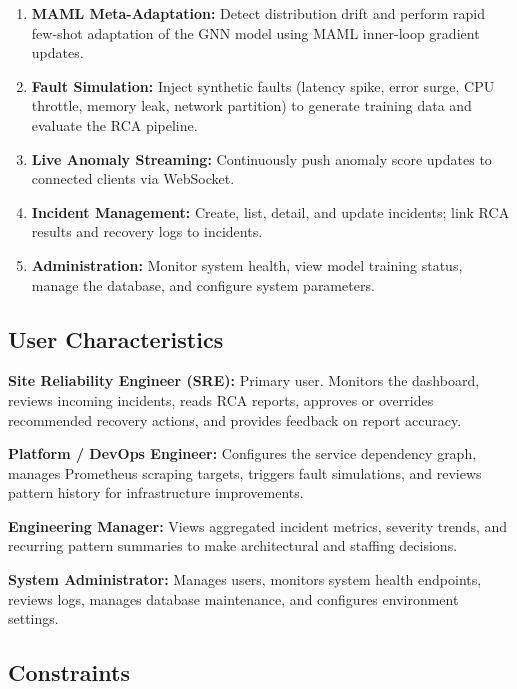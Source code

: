 \documentclass[11pt,a4paper]{article}
\begin{document}
\begin{enumerate}
    \item \textbf{MAML Meta-Adaptation:} Detect distribution drift and perform rapid few-shot adaptation of the GNN model using MAML inner-loop gradient updates.
    \item \textbf{Fault Simulation:} Inject synthetic faults (latency spike, error surge, CPU throttle, memory leak, network partition) to generate training data and evaluate the RCA pipeline.
    \item \textbf{Live Anomaly Streaming:} Continuously push anomaly score updates to connected clients via WebSocket.
    \item \textbf{Incident Management:} Create, list, detail, and update incidents; link RCA results and recovery logs to incidents.
    \item \textbf{Administration:} Monitor system health, view model training status, manage the database, and configure system parameters.
\end{enumerate}


\subsection{User Characteristics}

\textbf{Site Reliability Engineer (SRE):} Primary user. Monitors the dashboard, reviews incoming incidents, reads RCA reports, approves or overrides recommended recovery actions, and provides feedback on report accuracy.

\textbf{Platform / DevOps Engineer:} Configures the service dependency graph, manages Prometheus scraping targets, triggers fault simulations, and reviews pattern history for infrastructure improvements.

\textbf{Engineering Manager:} Views aggregated incident metrics, severity trends, and recurring pattern summaries to make architectural and staffing decisions.

\textbf{System Administrator:} Manages users, monitors system health endpoints, reviews logs, manages database maintenance, and configures environment settings.


\subsection{Constraints}
\end{document}
